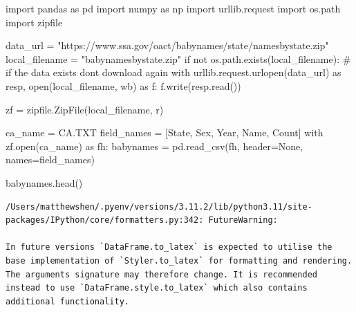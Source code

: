 \documentclass[
  letterpaper,
  DIV=11,
  numbers=noendperiod]{scrreprt}
\newenvironment{Shaded}{\begin{snugshade}}{\end{snugshade}}
\newcommand{\BuiltInTok}[1]{\textcolor[rgb]{0.00,0.23,0.31}{#1}}
\newcommand{\CommentTok}[1]{\textcolor[rgb]{0.37,0.37,0.37}{#1}}
\newcommand{\ControlFlowTok}[1]{\textcolor[rgb]{0.00,0.23,0.31}{#1}}
\newcommand{\ImportTok}[1]{\textcolor[rgb]{0.00,0.46,0.62}{#1}}
\newcommand{\KeywordTok}[1]{\textcolor[rgb]{0.00,0.23,0.31}{#1}}
\newcommand{\NormalTok}[1]{\textcolor[rgb]{0.00,0.23,0.31}{#1}}
\newcommand{\OperatorTok}[1]{\textcolor[rgb]{0.37,0.37,0.37}{#1}}
\newcommand{\StringTok}[1]{\textcolor[rgb]{0.13,0.47,0.30}{#1}}
\newcommand{\VariableTok}[1]{\textcolor[rgb]{0.07,0.07,0.07}{#1}}
\begin{document}
\begin{Shaded}
\begin{Highlighting}[]
\ImportTok{import}\NormalTok{ pandas }\ImportTok{as}\NormalTok{ pd}
\ImportTok{import}\NormalTok{ numpy }\ImportTok{as}\NormalTok{ np}
\ImportTok{import}\NormalTok{ urllib.request}
\ImportTok{import}\NormalTok{ os.path}
\ImportTok{import}\NormalTok{ zipfile}

\NormalTok{data\_url }\OperatorTok{=} \StringTok{"https://www.ssa.gov/oact/babynames/state/namesbystate.zip"}
\NormalTok{local\_filename }\OperatorTok{=} \StringTok{"babynamesbystate.zip"}
\ControlFlowTok{if} \KeywordTok{not}\NormalTok{ os.path.exists(local\_filename): }\CommentTok{\# if the data exists don\textquotesingle{}t download again}
    \ControlFlowTok{with}\NormalTok{ urllib.request.urlopen(data\_url) }\ImportTok{as}\NormalTok{ resp, }\BuiltInTok{open}\NormalTok{(local\_filename, }\StringTok{\textquotesingle{}wb\textquotesingle{}}\NormalTok{) }\ImportTok{as}\NormalTok{ f:}
\NormalTok{        f.write(resp.read())}

\NormalTok{zf }\OperatorTok{=}\NormalTok{ zipfile.ZipFile(local\_filename, }\StringTok{\textquotesingle{}r\textquotesingle{}}\NormalTok{)}

\NormalTok{ca\_name }\OperatorTok{=} \StringTok{\textquotesingle{}CA.TXT\textquotesingle{}}
\NormalTok{field\_names }\OperatorTok{=}\NormalTok{ [}\StringTok{\textquotesingle{}State\textquotesingle{}}\NormalTok{, }\StringTok{\textquotesingle{}Sex\textquotesingle{}}\NormalTok{, }\StringTok{\textquotesingle{}Year\textquotesingle{}}\NormalTok{, }\StringTok{\textquotesingle{}Name\textquotesingle{}}\NormalTok{, }\StringTok{\textquotesingle{}Count\textquotesingle{}}\NormalTok{]}
\ControlFlowTok{with}\NormalTok{ zf.}\BuiltInTok{open}\NormalTok{(ca\_name) }\ImportTok{as}\NormalTok{ fh:}
\NormalTok{    babynames }\OperatorTok{=}\NormalTok{ pd.read\_csv(fh, header}\OperatorTok{=}\VariableTok{None}\NormalTok{, names}\OperatorTok{=}\NormalTok{field\_names)}

\NormalTok{babynames.head()}
\end{Highlighting}
\end{Shaded}

\begin{verbatim}
/Users/matthewshen/.pyenv/versions/3.11.2/lib/python3.11/site-packages/IPython/core/formatters.py:342: FutureWarning:

In future versions `DataFrame.to_latex` is expected to utilise the base implementation of `Styler.to_latex` for formatting and rendering. The arguments signature may therefore change. It is recommended instead to use `DataFrame.style.to_latex` which also contains additional functionality.
\end{verbatim}
\end{document}
